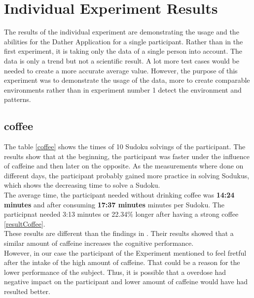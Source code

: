\FloatBarrier

\section{Individual Experiment Results}
The results of the individual experiment are demonstrating the usage and the abilities for the Dather Application for a single participant. Rather than in the first experiment, it is taking only the data of a single person into account.
The data is only a trend but not a scientific result. A lot more test cases would be needed to create a more accurate average value. However, the purpose of this experiment was to demonstrate the usage of the data, more to create comparable environments rather than in experiment number 1 detect the environment and patterns. 

\subsection{coffee}
The table \ref{coffee} shows the times of 10 Sudoku solvings of the participant. The results show that at the beginning, the participant was faster under the influence of caffeine and then later on the opposite. As the measurements where done on different days, the participant probably gained more practice in solving Sodukus, which shows the decreasing time to solve a Sudoku.
\\
The average time, the participant needed without drinking coffee was \textbf{14:24 minutes} and after consuming \textbf{17:37 minutes} minutes per Sudoku. The participnat needed 3:13 minutes or 22.34\%  longer after having a strong coffee \ref{resultCoffee}.\\
These results are different than the findings in \cite{liguori1997absorption}. Their results showed that a similar amount of caffeine increases the cognitive performance. \\
However, in our case the participant of the Experiment mentioned to feel fretful after the intake of the high amount of caffeine. That could be a reason for the lower performance of the subject. Thus, it is possible that a overdose had negative impact on the participant and lower amount of caffeine would have had resulted better. 

\FloatBarrier

